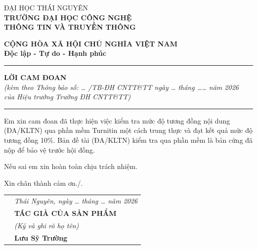 \documentclass[../main.tex]{subfiles}
\begin{document}
\noindent
\begin{minipage}[t]{0.45\textwidth}
\centering
ĐẠI HỌC THÁI NGUYÊN \\
\textbf{TRƯỜNG ĐẠI HỌC CÔNG NGHỆ} \\
\textbf{THÔNG TIN VÀ TRUYỀN THÔNG}
\end{minipage}%
\begin{minipage}[t]{0.59\textwidth}
\centering
\textbf{CỘNG HÒA XÃ HỘI CHỦ NGHĨA VIỆT NAM} \\
\textbf{Độc lập - Tự do - Hạnh phúc} \\
\rule{0.6\linewidth}{0.4pt}
\end{minipage}

\vspace{1cm}

\begin{center}
\textbf{LỜI CAM ĐOAN}\\[0.3cm]
\textit{(kèm theo Thông báo số: \ldots{} /TB-ĐH CNTT\&TT ngày \ldots{} tháng \ldots\ldots{} năm 2026}\\
\textit{của Hiệu trưởng Trường ĐH CNTT\&TT)}\\[0.1cm]
\rule{0.4\textwidth}{0.4pt}
\end{center}

\vspace{0.5cm}

\hspace{1cm} Em xin cam đoan đã thực hiện việc kiểm tra mức độ tương đồng nội dung (ĐA/KLTN) qua phần mềm Turnitin một cách trung thực và đạt kết quả mức độ tương đồng 10\%. Bản đề tài (ĐA/KLTN) kiểm tra qua phần mềm là bản cứng đã nộp để bảo vệ trước hội đồng.

\hspace{1cm} Nếu sai em xin hoàn toàn chịu trách nhiệm.

\hspace{1cm} Xin chân thành cảm ơn./.

\vspace{1cm}

\begin{tabular}{p{} >{\centering\arraybackslash}p{}}
 & \textit{Thái Nguyên, ngày \ldots{} tháng \ldots{} năm 2026} \\[0.5cm]
 & \textbf{TÁC GIẢ CỦA SẢN PHẨM} \\
 & \textit{(Ký và ghi rõ họ tên)} \\[2cm]
 & \textbf{Lưu Sỹ Trường}
\end{tabular}
\end{document}
